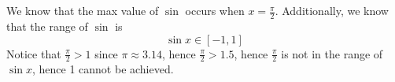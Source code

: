 \documentclass{article}
\begin{document}
\section{}
We know that the max value of $\sin$ occurs when $x = \frac{\pi}{2}$. Additionally, we know that the range of $\sin$ is
\[\sin x \in [-1, 1]\]
 Notice that $\frac{\pi}{2} > 1 $ since $\pi \approx 3.14$, hence $\frac{\pi}{2} > 1.5$, hence $\frac{\pi}{2}$ is not in the range of $\sin x$, hence 1 cannot be achieved. 
\end{document}
